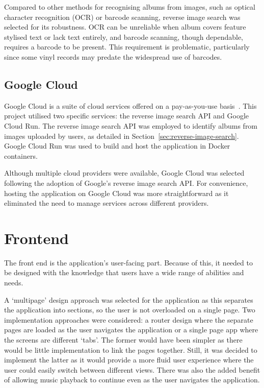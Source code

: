 Compared to other methods for recognising albums from images, such as optical character recognition (OCR) or barcode scanning, reverse image search was selected for its robustness. OCR can be unreliable when album covers feature stylised text or lack text entirely, and barcode scanning, though dependable, requires a barcode to be present. This requirement is problematic, particularly since some vinyl records may predate the widespread use of barcodes.

\subsection{Google Cloud}
Google Cloud is a suite of cloud services offered on a pay-as-you-use basis~\cite{GCP}. This project utilised two specific services: the reverse image search API and Google Cloud Run. The reverse image search API was employed to identify albums from images uploaded by users, as detailed in Section~\ref{sec:reverse-image-search}. Google Cloud Run was used to build and host the application in Docker containers.

Although multiple cloud providers were available, Google Cloud was selected following the adoption of Google's reverse image search API. For convenience, hosting the application on Google Cloud was more straightforward as it eliminated the need to manage services across different providers.

\section{Frontend}
The front end is the application's user-facing part. Because of this, it needed to be designed with the knowledge that users have a wide range of abilities and needs.

A `multipage' design approach was selected for the application as this separates the application into sections, so the user is not overloaded on a single page. Two implementation approaches were considered: a router design where the separate pages are loaded as the user navigates the application or a single page app where the screens are different `tabs'. The former would have been simpler as there would be little implementation to link the pages together. Still, it was decided to implement the latter as it would provide a more fluid user experience where the user could easily switch between different views. There was also the added benefit of allowing music playback to continue even as the user navigates the application.

